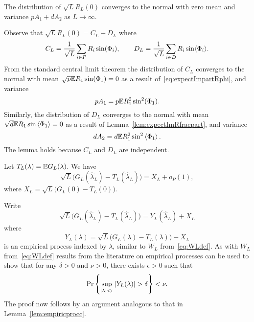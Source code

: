 \documentclass[draftcls, onecolumn, 11pt]{IEEEtran}
\begin{document}
\begin{lemma}\label{lem:convdistGLdash}
The distribution of $\sqrt{L}R_L(0)$ converges to the normal with zero mean and variance $pA_1 + dA_2$ as $L\rightarrow\infty$.
\end{lemma}
\begin{IEEEproof}
Observe that $\sqrt{L} R_L(0) = C_L + D_L$ where
\[
C_L = \frac{1}{\sqrt{L}} \sum_{i \in P} R_i \sin(\Phi_i), \qquad D_L = \frac{1}{\sqrt{L}} \sum_{i \in D} R_i \sin\langle \Phi_i \rangle.
\]
From the standard central limit theorem the distribution of $C_L$ converges to the normal with mean $\sqrt{p}{\mathbb E} R_1 \sin(\Phi_1) = 0$ as a result of~\eqref{eq:expectImpartRphi}, and variance
\[
p A_1 = p {\mathbb E} R_1^2 \sin^2(\Phi_1).
\]
Similarly, the distribution of $D_L$ converges to the normal with mean $\sqrt{d}{\mathbb E} R_1 \sin\left\langle \Phi_1 \right\rangle = 0$ as a result of Lemma~\ref{lem:expectImRfracpart}, and variance
\[
d A_2 = d {\mathbb E} R_1^2 \sin^2\left\langle \Phi_1 \right\rangle.
\]
The lemma holds because $C_L$ and $D_L$ are independent. 
\end{IEEEproof}

\begin{lemma}\label{lem:empiricprocforrho} Let $T_L(\lambda) = {\mathbb E} G_L(\lambda)$.  We have
\[
\sqrt{L}\big( G_L(\hat{\lambda}_L) - T_L(\hat{\lambda}_L) \big) =  X_L + o_P(1),
\]
where $X_L = \sqrt{L} \big( G_L(0) - T_L(0) \big)$.
\end{lemma}
\begin{IEEEproof}
Write
\[
\sqrt{L}\big( G_L(\hat{\lambda}_L) - T_L(\hat{\lambda}_L) \big) = Y_L(\hat{\lambda}_L) + X_L
\]
where
\begin{equation}\label{eq:YLdef}
Y_L(\lambda) = \sqrt{L}\big( G_L(\lambda) - T_L(\lambda) \big) - X_L
\end{equation}
is an empirical process indexed by $\lambda$, similar to $W_L$ from~\eqref{eq:WLdef}.  As with $W_L$ from~\eqref{eq:WLdef} results from the literature on empirical processes can be used to show that  
for any $\delta > 0$ and $\nu > 0$, there exists $\epsilon > 0$ such that
\[
\Pr\left\{ \sup_{{\vert \lambda \vert}<\epsilon}{\vert Y_L(\lambda) \vert} > \delta  \right\} < \nu.
\]
The proof now follows by an argument analogous to that in Lemma~\ref{lem:empiricprocc}.
\end{IEEEproof}
\end{document}
